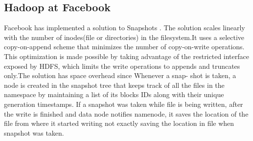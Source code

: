 \subsection{Hadoop at Facebook}
Facebook has implemented a solution to Snapshots \cite{Facebook}. The solution scales linearly with the number of inodes(file or directories) in the filesystem.It uses a selective copy-on-append scheme that minimizes the number of copy-on-write operations. This optimization is made possible by taking advantage of the restricted interface exposed by HDFS, which limits the write operations to appends and truncates only.The solution has space overhead since Whenever a snap-
shot is taken, a node is created in the snapshot tree  that keeps track of all the files in the
namespace by maintaining a list of its blocks IDs along with their unique generation timestamps.
If a snapshot was taken while file is being written, after the write is finished and data node notifies namenode, it saves the location of the file from  where it started writing not exactly saving the location in file when snapshot was taken.






